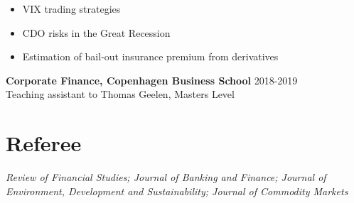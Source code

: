 \documentclass[11pt]{res} %
\newcommand{\fullhrulefill}{%
  \vspace{-1ex}%
  \hspace*{-\sectionwidth}\hrulefill%
  }
\begin{document}
\begin{resume}
\begin{itemize} \itemsep -2pt %
\item VIX trading strategies
\item CDO risks in the Great Recession
\item Estimation of bail-out insurance premium from derivatives
\end{itemize} 
\fi

{\bf Corporate Finance, Copenhagen Business School} \hfill 2018-2019  \\%
Teaching assistant to Thomas Geelen, Masters Level 


\vspace{0.2in} %

\section{Referee}
\fullhrulefill \newline
\textit{Review of Financial Studies; Journal of Banking and Finance; Journal of Environment, Development and Sustainability; Journal of Commodity Markets}



\vspace{0.2in} %


\end{resume}
\end{document}
